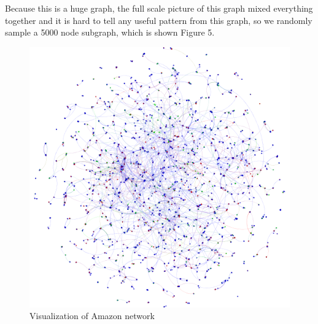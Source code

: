 Because this is a huge graph, the full scale picture of this graph mixed everything together and it is hard to tell any useful pattern from this graph, so we randomly sample a 5000 node subgraph, which is shown Figure 5.

\begin{table}[!ht]
\centering
{}
\end{table} 

\begin{figure}[!ht]
	\centering
	\begin{minipage}[b]{0.5\linewidth}
	\centering
	\includegraphics[width=\textwidth]{FIG/amazon.png}
	\caption{Visualization of Amazon network}
	\label{fig:figure1}
	\end{minipage}
\end{figure}	


